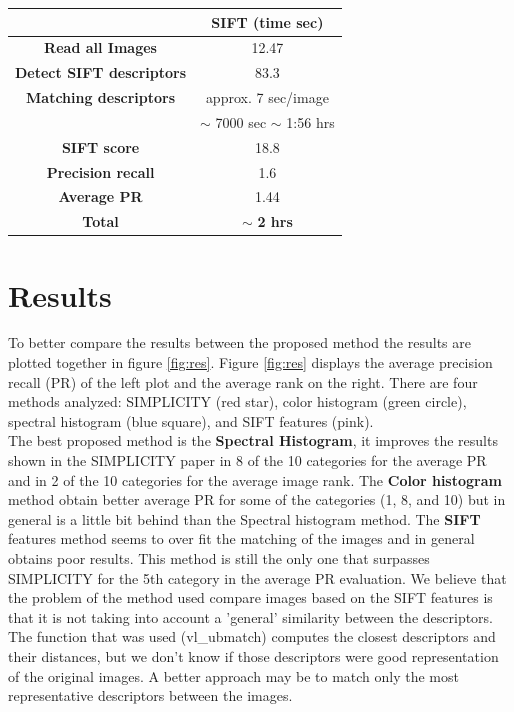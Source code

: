 \documentclass[a4paper,12pt]{article}
\begin{document}
\begin{table}[h!]
    \centering
    \begin{tabular}{|c|c|}
        \hline
        & SIFT (time sec) \\
        \hline
        \textbf{Read all Images} & 12.47 \\
        \hline
        \textbf{Detect SIFT descriptors} & 83.3 \\
        \hline
        \textbf{Matching descriptors} & approx. 7 sec/image\\
        & $\sim$ 7000 sec $\sim$ 1:56 hrs\\
        \hline
        \textbf{SIFT score} & 18.8 \\
        \hline
        \textbf{Precision recall} & 1.6 \\
        \hline
        \textbf{Average PR} & 1.44 \\
        \hline
        \textbf{Total} & $\sim$ \textbf{2 hrs}\\
        \hline
    \end{tabular}
    \label{tab:sift}
\end{table}

\section{Results}

To better compare the results between the proposed method the results are plotted together
in figure \ref{fig:res}. Figure \ref{fig:res} displays the average precision recall (PR) of the
left plot and the average rank on the right. There are four methods analyzed: SIMPLICITY (red star),
color histogram (green circle), spectral histogram (blue square), and SIFT features (pink).\\

The best proposed method is the \textbf{Spectral Histogram}, it improves the results shown in 
the SIMPLICITY paper in 8 of the 10 categories for the average PR and in 2 
of the 10 categories for the average image rank. The \textbf{Color histogram} method obtain
better average PR for some of the categories (1, 8, and 10) but in general is 
a little bit behind than the Spectral histogram method. The \textbf{SIFT} features 
method seems to over fit the matching of the images and in general obtains poor results. 
This method is still the only one that surpasses SIMPLICITY for the 5th category in the average PR
evaluation. We believe that the problem of the method used compare images based on the
SIFT features is that it is not taking into account a 'general' similarity between the descriptors. 
The function that was used (vl\_ubmatch) computes the closest descriptors and their distances, but 
we don't know if those descriptors were good representation of the original images. A better approach may 
be to match only the most representative descriptors between the images. 
\end{document}
